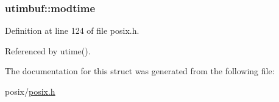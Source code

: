\subsubsection[{\texorpdfstring{modtime}{modtime}}]{ utimbuf\+::modtime}\hypertarget{structutimbuf_a7588ffe699a9eda52e94aa593bf7d6d8}{}\label{structutimbuf_a7588ffe699a9eda52e94aa593bf7d6d8}


Definition at line 124 of file posix.\+h.



Referenced by utime().



The documentation for this struct was generated from the following file\+:\begin{DoxyCompactItemize}
\item 
posix/\hyperlink{posix_8h}{posix.\+h}\end{DoxyCompactItemize}

